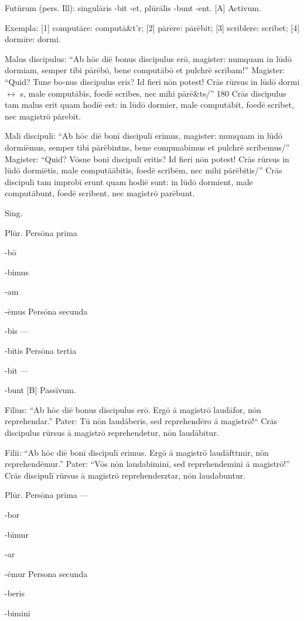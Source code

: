 \documentclass[11pt,openany]{book}
\newcommand{\contr}{$\leftrightarrow$}
\begin{document}
Futūrum (pers. Ill): singulāris -bit -et, plūrālis -bunt -ent. [A] Activum.

Exempla: [1] computāre: computā\&t'r; [2] pārēre: pārēbit; [3] scriblere: scribet; [4] dormīre: dormi.

Malus discipulus: ``Ab hōc diē bonus discipulus erō, magister: numquam in lūdō dormiam, semper tibi pārēbō, bene computābō et pulchrē scrībam!'' Magister: ``Quid? Tune bo-nus discipulus eris? Id fieri nōn potest! Crās rūrsus in lūdō dormi \contr{} s, male computābis, foedē scribes, nec mihi pārē\&ts/'' 180 Crās discipulus tam malus erit quam hodiē est: in lūdō dormier, male computābit, foedē scribet, nec magistrō pārebit.

Malī discipulī: ``Ab hōc diē bonī discipulī erimus, magister: numquam in lūdō dormiēmus, semper tibi pārēbintns, bene compmabimus et pulchrē scribemus/'' Magister: ``Quid? Vōsne bonī discipulī eritis? Id fieri nōn potest! Crās rūrsus in lūdō dormiētis, male computāābitis, foedē scribēm, nec mihi pārēbitis/'' Crās discipulī tam improbī erunt quam hodiē sunt: in lūdō dormient, male computābunt, foedē scribent, nec magistrō parēbunt.

Sing.

Plūr. Persōna prīma

-bō

-bimus

-am

-ēmus Persōna secunda

-bis ---

-bitis Persōna tertia

-bit ---

-bunt [B] Passīvum.

Fīlius: ``Ab hōc diē bonus discipulus erō. Ergō ā magistrō laudāfor, nōn reprehendar.'' Pater: Tū nōn laudāberis, sed reprehendēro ā magistrō!`` Crās discipulus rūrsus ā magistrō reprehendetur, nōn laudābitur.

Filii: ``Ab hōc diē bonī discipulī erimus. Ergō ā magistrō laudāfttmir, nōn reprehendēmur.'' Pater: ``Vōs nōn laudabiminī, sed reprehendemini ā magistrō!'' Crās discipulī rūrsus ā magistrō reprehenderztar, nōn laudabuntur.

Plūr. Persōna prima ---

-bor

-bimur

-ar

-ēmur Persona secunda

-beris

-biminī
\end{document}
